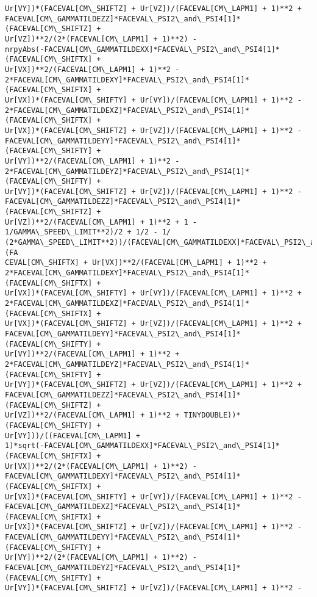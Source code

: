 \documentclass[landscape,letterpaper,10pt,english]{article}
\begin{document}
\begin{Verbatim}[commandchars=\\\{\}]
Ur[VY])*(FACEVAL[CM\_SHIFTZ] + Ur[VZ])/(FACEVAL[CM\_LAPM1] + 1)**2 +
FACEVAL[CM\_GAMMATILDEZZ]*FACEVAL\_PSI2\_and\_PSI4[1]*(FACEVAL[CM\_SHIFTZ] +
Ur[VZ])**2/(2*(FACEVAL[CM\_LAPM1] + 1)**2) -
nrpyAbs(-FACEVAL[CM\_GAMMATILDEXX]*FACEVAL\_PSI2\_and\_PSI4[1]*(FACEVAL[CM\_SHIFTX] +
Ur[VX])**2/(FACEVAL[CM\_LAPM1] + 1)**2 -
2*FACEVAL[CM\_GAMMATILDEXY]*FACEVAL\_PSI2\_and\_PSI4[1]*(FACEVAL[CM\_SHIFTX] +
Ur[VX])*(FACEVAL[CM\_SHIFTY] + Ur[VY])/(FACEVAL[CM\_LAPM1] + 1)**2 -
2*FACEVAL[CM\_GAMMATILDEXZ]*FACEVAL\_PSI2\_and\_PSI4[1]*(FACEVAL[CM\_SHIFTX] +
Ur[VX])*(FACEVAL[CM\_SHIFTZ] + Ur[VZ])/(FACEVAL[CM\_LAPM1] + 1)**2 -
FACEVAL[CM\_GAMMATILDEYY]*FACEVAL\_PSI2\_and\_PSI4[1]*(FACEVAL[CM\_SHIFTY] +
Ur[VY])**2/(FACEVAL[CM\_LAPM1] + 1)**2 -
2*FACEVAL[CM\_GAMMATILDEYZ]*FACEVAL\_PSI2\_and\_PSI4[1]*(FACEVAL[CM\_SHIFTY] +
Ur[VY])*(FACEVAL[CM\_SHIFTZ] + Ur[VZ])/(FACEVAL[CM\_LAPM1] + 1)**2 -
FACEVAL[CM\_GAMMATILDEZZ]*FACEVAL\_PSI2\_and\_PSI4[1]*(FACEVAL[CM\_SHIFTZ] +
Ur[VZ])**2/(FACEVAL[CM\_LAPM1] + 1)**2 + 1 - 1/GAMMA\_SPEED\_LIMIT**2)/2 + 1/2 - 1/
(2*GAMMA\_SPEED\_LIMIT**2))/(FACEVAL[CM\_GAMMATILDEXX]*FACEVAL\_PSI2\_and\_PSI4[1]*(FA
CEVAL[CM\_SHIFTX] + Ur[VX])**2/(FACEVAL[CM\_LAPM1] + 1)**2 +
2*FACEVAL[CM\_GAMMATILDEXY]*FACEVAL\_PSI2\_and\_PSI4[1]*(FACEVAL[CM\_SHIFTX] +
Ur[VX])*(FACEVAL[CM\_SHIFTY] + Ur[VY])/(FACEVAL[CM\_LAPM1] + 1)**2 +
2*FACEVAL[CM\_GAMMATILDEXZ]*FACEVAL\_PSI2\_and\_PSI4[1]*(FACEVAL[CM\_SHIFTX] +
Ur[VX])*(FACEVAL[CM\_SHIFTZ] + Ur[VZ])/(FACEVAL[CM\_LAPM1] + 1)**2 +
FACEVAL[CM\_GAMMATILDEYY]*FACEVAL\_PSI2\_and\_PSI4[1]*(FACEVAL[CM\_SHIFTY] +
Ur[VY])**2/(FACEVAL[CM\_LAPM1] + 1)**2 +
2*FACEVAL[CM\_GAMMATILDEYZ]*FACEVAL\_PSI2\_and\_PSI4[1]*(FACEVAL[CM\_SHIFTY] +
Ur[VY])*(FACEVAL[CM\_SHIFTZ] + Ur[VZ])/(FACEVAL[CM\_LAPM1] + 1)**2 +
FACEVAL[CM\_GAMMATILDEZZ]*FACEVAL\_PSI2\_and\_PSI4[1]*(FACEVAL[CM\_SHIFTZ] +
Ur[VZ])**2/(FACEVAL[CM\_LAPM1] + 1)**2 + TINYDOUBLE))*(FACEVAL[CM\_SHIFTY] +
Ur[VY]))/((FACEVAL[CM\_LAPM1] +
1)*sqrt(-FACEVAL[CM\_GAMMATILDEXX]*FACEVAL\_PSI2\_and\_PSI4[1]*(FACEVAL[CM\_SHIFTX] +
Ur[VX])**2/(2*(FACEVAL[CM\_LAPM1] + 1)**2) -
FACEVAL[CM\_GAMMATILDEXY]*FACEVAL\_PSI2\_and\_PSI4[1]*(FACEVAL[CM\_SHIFTX] +
Ur[VX])*(FACEVAL[CM\_SHIFTY] + Ur[VY])/(FACEVAL[CM\_LAPM1] + 1)**2 -
FACEVAL[CM\_GAMMATILDEXZ]*FACEVAL\_PSI2\_and\_PSI4[1]*(FACEVAL[CM\_SHIFTX] +
Ur[VX])*(FACEVAL[CM\_SHIFTZ] + Ur[VZ])/(FACEVAL[CM\_LAPM1] + 1)**2 -
FACEVAL[CM\_GAMMATILDEYY]*FACEVAL\_PSI2\_and\_PSI4[1]*(FACEVAL[CM\_SHIFTY] +
Ur[VY])**2/(2*(FACEVAL[CM\_LAPM1] + 1)**2) -
FACEVAL[CM\_GAMMATILDEYZ]*FACEVAL\_PSI2\_and\_PSI4[1]*(FACEVAL[CM\_SHIFTY] +
Ur[VY])*(FACEVAL[CM\_SHIFTZ] + Ur[VZ])/(FACEVAL[CM\_LAPM1] + 1)**2 -

\end{Verbatim}
\end{document}
